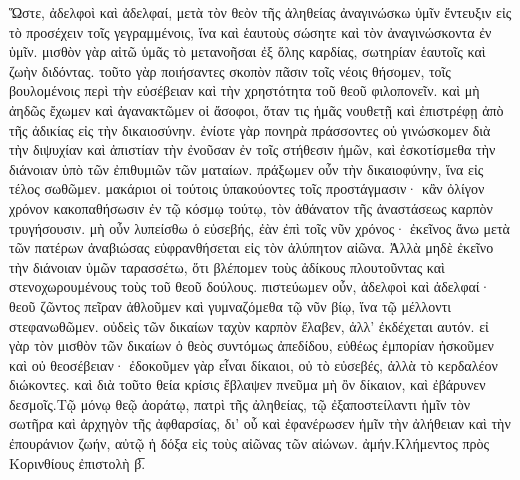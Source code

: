 Ὥστε, ἀδελφοὶ καὶ ἀδελφαί, μετὰ τὸν θεὸν τῆς ἀληθείας ἀναγινώσκω ὑμῖν ἔντευξιν εἰς τὸ προσέχειν τοῖς γεγραμμένοις, ἵνα καὶ ἑαυτοὺς σώσητε καὶ τὸν ἀναγινώσκοντα ἐν ὑμῖν. μισθὸν γὰρ αἰτῶ ὑμᾶς τὸ μετανοῆσαι ἐξ ὅλης καρδίας, σωτηρίαν ἑαυτοῖς καὶ ζωὴν διδόντας. τοῦτο γὰρ ποιήσαντες σκοπὸν πᾶσιν τοῖς νέοις θήσομεν, τοῖς βουλομένοις περὶ τὴν εὐσέβειαν καὶ τὴν χρηστότητα τοῦ θεοῦ φιλοπονεῖν. καὶ μὴ ἀηδῶς ἔχωμεν καὶ ἀγανακτῶμεν οἱ ἄσοφοι, ὅταν τις ἡμᾶς νουθετῇ καὶ ἐπιστρέφῃ ἀπὸ τῆς ἀδικίας εἰς τὴν δικαιοσύνην. ἐνίοτε γὰρ πονηρὰ πράσσοντες οὐ γινώσκομεν διὰ τὴν διψυχίαν καὶ ἀπιστίαν τὴν ἐνοῦσαν ἐν τοῖς στήθεσιν ἡμῶν, καὶ ἐσκοτίσμεθα τὴν διάνοιαν ὑπὸ τῶν ἐπιθυμιῶν τῶν ματαίων. πράξωμεν οὖν τὴν δικαιοφύνην, ἵνα εἰς τέλος σωθῶμεν. μακάριοι οἱ τούτοις ὑπακούοντες τοῖς προστάγμασιν· κἂν ὀλίγον χρόνον κακοπαθήσωσιν ἐν τῷ κόσμῳ τούτῳ, τὸν ἀθάνατον τῆς ἀναστάσεως καρπὸν τρυγήσουσιν. μὴ οὖν λυπείσθω ὁ εὐσεβής, ἐὰν ἐπὶ τοῖς νῦν χρόνος· ἐκεῖνος ἄνω μετὰ τῶν πατέρων ἀναβιώσας εὐφρανθήσεται εἰς τὸν ἀλύπητον αἰῶνα. 
Ἀλλὰ μηδὲ ἐκεῖνο τὴν διάνοιαν ὑμῶν ταρασσέτω, ὅτι βλέπομεν τοὺς ἀδίκους πλουτοῦντας καὶ στενοχωρουμένους τοὺς τοῦ θεοῦ δούλους. πιστεύωμεν οὖν, ἀδελφοὶ καὶ ἀδελφαί· θεοῦ ζῶντος πεῖραν ἀθλοῦμεν καὶ γυμναζόμεθα τῷ νῦν βίῳ, ἵνα τῷ μέλλοντι στεφανωθῶμεν. οὐδεὶς τῶν δικαίων ταχὺν καρπὸν ἔλαβεν, ἀλλ’ ἐκδέχεται αυτόν. εἰ γὰρ τὸν μισθὸν τῶν δικαίων ὁ θεὸς συντόμως ἀπεδίδου, εὐθέως ἐμπορίαν ἠσκοῦμεν καὶ οὐ θεοσέβειαν· ἐδοκοῦμεν γὰρ εἶναι δίκαιοι, οὐ τὸ εὐσεβές, ἀλλὰ τὸ κερδαλέον διώκοντες. καὶ διὰ τοῦτο θεία κρίσις ἔβλαψεν πνεῦμα μὴ ὂν δίκαιον, καὶ ἐβάρυνεν δεσμοῖς.Τῷ μόνῳ θεῷ ἀοράτῳ, πατρὶ τῆς ἀληθείας, τῷ ἐξαποστείλαντι ἡμῖν τὸν σωτῆρα καὶ ἀρχηγὸν τῆς ἀφθαρσίας, δι’ οὗ καὶ ἐφανέρωσεν ἡμῖν τὴν ἀλήθειαν καὶ τὴν ἐπουράνιον ζωήν, αὐτῷ ἡ δόξα εἰς τοὺς αἰῶνας τῶν αἰώνων. ἀμήν.Κλήμεντος πρὸς Κορινθίους ἐπιστολὴ β̅.

